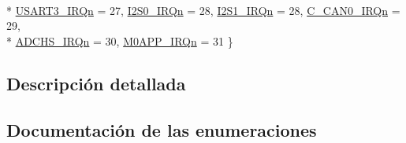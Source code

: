 \begin{DoxyCompactItemize}
\\*
\hyperlink{group___c_m_s_i_s__43_x_x___m0___i_r_q_gga402456eb2f4f5b3dc2a53f725eed9485afb13802afc1f5fdf5c90e73ee99e5ff3}{U\+S\+A\+R\+T3\+\_\+\+I\+R\+Qn} = 27, 
\hyperlink{group___c_m_s_i_s__43_x_x___m0___i_r_q_gga402456eb2f4f5b3dc2a53f725eed9485aa271069cfa2ba32e9b0ca1712f38145d}{I2\+S0\+\_\+\+I\+R\+Qn} = 28, 
\hyperlink{group___c_m_s_i_s__43_x_x___m0___i_r_q_gga402456eb2f4f5b3dc2a53f725eed9485ae55f3838e285afe4674fd1b58f3c036e}{I2\+S1\+\_\+\+I\+R\+Qn} = 28, 
\hyperlink{group___c_m_s_i_s__43_x_x___m0___i_r_q_gga402456eb2f4f5b3dc2a53f725eed9485a646fe1670a0623976ee89d8ee2ffcd76}{C\+\_\+\+C\+A\+N0\+\_\+\+I\+R\+Qn} = 29, 
\\*
\hyperlink{group___c_m_s_i_s__43_x_x___m0___i_r_q_gga402456eb2f4f5b3dc2a53f725eed9485a5075132f7f7ad108646e9a71c5085bee}{A\+D\+C\+H\+S\+\_\+\+I\+R\+Qn} = 30, 
\hyperlink{group___c_m_s_i_s__43_x_x___m0___i_r_q_gga402456eb2f4f5b3dc2a53f725eed9485ac09b0a49b72e62295f1093d14864b38b}{M0\+A\+P\+P\+\_\+\+I\+R\+Qn} = 31
 \}
\end{DoxyCompactItemize}


\subsection{Descripción detallada}


\subsection{Documentación de las enumeraciones}
